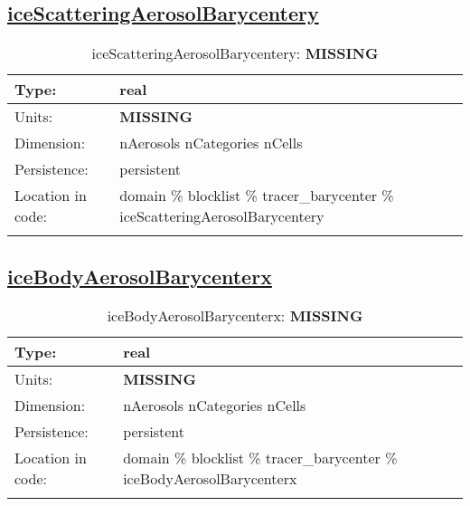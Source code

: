 \subsection[iceScatteringAerosolBarycentery]{\hyperref[sec:var_tab_tracer_barycenter]{iceScatteringAerosolBarycentery}}
\label{subsec:var_sec_tracer_barycenter_iceScatteringAerosolBarycentery}
\begin{center}
\begin{longtable}{| p{2.0in} | p{4.0in} |}
        \hline 
        Type: & real \\
        \hline 
        Units: & {\bf \color{red} MISSING} \\
        \hline 
        Dimension: & nAerosols nCategories nCells \\
        \hline 
        Persistence: & persistent \\
        \hline 
         Location in code: & domain \% blocklist \% tracer\_barycenter \% iceScatteringAerosolBarycentery \\
         \hline 
    \caption{iceScatteringAerosolBarycentery: {\bf \color{red} MISSING}}
\end{longtable}
\end{center}
\subsection[iceBodyAerosolBarycenterx]{\hyperref[sec:var_tab_tracer_barycenter]{iceBodyAerosolBarycenterx}}
\label{subsec:var_sec_tracer_barycenter_iceBodyAerosolBarycenterx}
\begin{center}
\begin{longtable}{| p{2.0in} | p{4.0in} |}
        \hline 
        Type: & real \\
        \hline 
        Units: & {\bf \color{red} MISSING} \\
        \hline 
        Dimension: & nAerosols nCategories nCells \\
        \hline 
        Persistence: & persistent \\
        \hline 
         Location in code: & domain \% blocklist \% tracer\_barycenter \% iceBodyAerosolBarycenterx \\
         \hline 
    \caption{iceBodyAerosolBarycenterx: {\bf \color{red} MISSING}}
\end{longtable}
\end{center}

